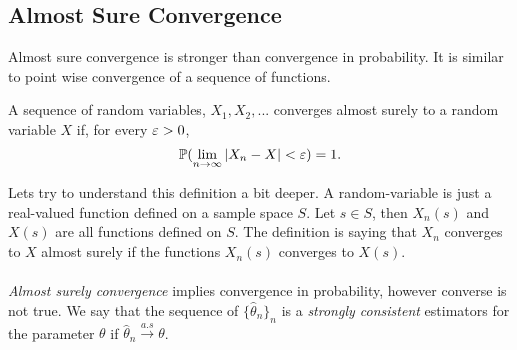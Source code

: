 \subsection{Almost Sure Convergence}
Almost sure convergence is stronger than convergence in probability. It is similar to point wise convergence of a sequence of functions.
\begin{definition}
    A sequence of random variables, $X_1,X_2,...$ converges almost surely to a random variable $X$ if, for every $\varepsilon > 0$,
    $$
    \mathbb P(\lim_{n \to \infty}|X_n - X|< \varepsilon ) = 1.
    $$
\end{definition}
Lets try to understand this definition a bit deeper. A random-variable is just a real-valued function defined on a sample space $S$. Let $s \in S$, then $X_{n}(s)$ and $X(s)$ are all functions defined on $S$. The definition is saying that $X_n$ converges to $X$ almost surely if the functions $X_{n}(s)$ converges to $X(s)$.\\
\\
 \textit{Almost surely convergence} implies convergence in probability, however converse is not true. We say that the sequence of $\{ \hat{\theta}_n \}_n$ is a \textit{strongly consistent} estimators for the parameter $\theta$ if $\hat{\theta}_n \xrightarrow{a.s} \theta$.